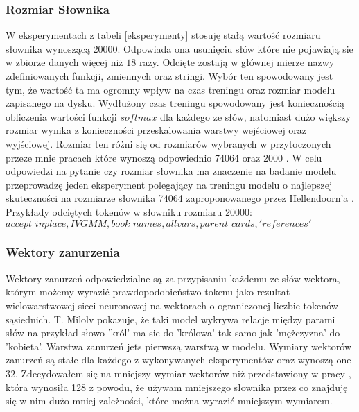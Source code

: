 \subsubsection{Rozmiar Słownika}
W eksperymentach z tabeli \ref{eksperymenty} stosuję stałą wartość rozmiaru słownika wynoszącą \begin{math}20000\end{math}. Odpowiada ona usunięciu słów które nie pojawiają sie w 
zbiorze danych więcej niż \begin{math}18\end{math} razy. Odcięte zostają w głównej mierze nazwy zdefiniowanych funkcji, zmiennych oraz stringi.
Wybór ten spowodowany jest tym, że wartość ta ma ogromny wpływ na czas treningu oraz rozmiar modelu zapisanego na dysku. 
Wydłużony czas treningu spowodowany jest koniecznością obliczenia wartości funkcji \begin{math}softmax\end{math} dla każdego ze słów, natomiast dużo większy rozmiar wynika z konieczności 
przeskalowania warstwy wejściowej oraz wyjściowej. Rozmiar ten różni się od rozmiarów wybranych w przytoczonych przeze mnie pracach które wynoszą odpowiednio 74064 \cite{hellendoorn} oraz 
2000 \cite{contextual_code_completion}. W celu odpowiedzi na pytanie czy rozmiar słownika ma znaczenie na badanie modelu przeprowadzę jeden eksperyment polegający na treningu modelu o najlepszej 
skuteczności na rozmiarze słownika 74064 zaproponowanego przez Hellendoorn'a \cite{hellendoorn}. 
Przykłady odciętych tokenów w słowniku rozmiaru 20000:\\ \begin{math}accept\_inplace, IVGMM, book\_names, allvars, parent\_cards, 'references'\end{math}
\subsubsection{Wektory zanurzenia}
Wektory zanurzeń odpowiedzialne są za przypisaniu każdemu ze słów wektora, którym możemy wyrazić prawdopodobieństwo tokenu jako rezultat wielowarstwowej sieci neuronowej na wektorach 
o ograniczonej liczbie tokenów sąsiednich. T. Milolv \cite{word2vec} pokazuje, że taki model wykrywa relacje między parami słów na przykład słowo 'król' ma sie do 'królowa' tak samo 
jak 'mężczyzna' do 'kobieta'. Warstwa zanurzeń jets pierwszą warstwą w modelu.
Wymiary wektorów zanurzeń są stałe dla każdego z wykonywanych eksperymentów oraz wynoszą one \begin{math}32\end{math}. Zdecydowałem się na mniejszy wymiar wektorów niż przedstawiony 
w pracy \cite{hellendoorn}, która wynosiła 128 z powodu, że używam mniejszego słownika przez co znajduję się w nim dużo mniej zależności, które można wyrazić mniejszym wymiarem. 
